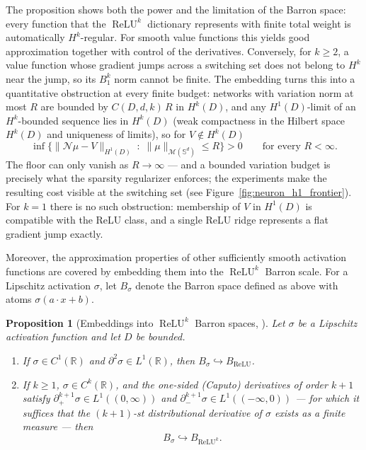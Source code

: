\documentclass[11pt]{amsart}
\newtheorem{proposition}[theorem]{Proposition}
\theoremstyle{definition}
\theoremstyle{remark}
\DeclareMathOperator{\relu}{ReLU}
\newcommand{\reluk}{\relu^{k}}
\begin{document}
The proposition shows both the power and the limitation of the Barron space: every function that the $\reluk$ dictionary represents with finite total weight is automatically $H^k$-regular.
For smooth value functions this yields good approximation together with control of the derivatives.
Conversely, for $k \ge 2$, a value function whose gradient jumps across a switching set does not belong to $H^k$ near the jump, so its $B_1^k$ norm cannot be finite. The embedding turns this into a quantitative obstruction at every finite budget: networks with variation norm at most $R$ are bounded by $C(D, d, k)\, R$ in $H^k(D)$, and any $H^1(D)$-limit of an $H^k$-bounded sequence lies in $H^k(D)$ (weak compactness in the Hilbert space $H^k(D)$ and uniqueness of limits), so for $V \notin H^k(D)$
\begin{equation*}
	\inf \big\{ \|\mathcal{N}\mu - V\|_{H^1(D)} \;:\; \|\mu\|_{\mathcal{M}(\mathbb{S}^d)} \le R \big\} > 0
	\qquad \text{for every } R < \infty.
\end{equation*}
The floor can only vanish as $R \to \infty$ --- and a bounded variation budget is precisely what the sparsity regularizer enforces; the experiments make the resulting cost visible at the switching set (see Figure~\ref{fig:neuron_h1_frontier}). For $k = 1$ there is no such obstruction: membership of $V$ in $H^1(D)$ is compatible with the ReLU class, and a single ReLU ridge represents a flat gradient jump exactly.

Moreover, the approximation properties of other sufficiently smooth activation functions are covered by embedding them into the $\reluk$ Barron scale. For a Lipschitz activation $\sigma$, let $B_\sigma$ denote the Barron space defined as above with atoms $\sigma(a \cdot x + b)$.

\begin{proposition}[Embeddings into $\reluk$ Barron spaces, {\cite[Theorem~1]{heeringa2024embeddings}}]
	Let $\sigma$ be a Lipschitz activation function and let $D$ be bounded.
	\begin{enumerate}
		\item If $\sigma \in C^1(\mathbb{R})$ and $\partial^2 \sigma \in L^1(\mathbb{R})$, then $B_\sigma \hookrightarrow B_{\relu}$.
		\item If $k \ge 1$, $\sigma \in C^{k}(\mathbb{R})$, and the one-sided (Caputo) derivatives of order $k+1$ satisfy $\partial_+^{k+1}\sigma \in L^1((0, \infty))$ and $\partial_-^{k+1}\sigma \in L^1((-\infty, 0))$ --- for which it suffices that the $(k+1)$-st distributional derivative of $\sigma$ exists as a finite measure --- then
		\begin{equation*}
			B_\sigma \hookrightarrow B_{\relu^{k}}.
		\end{equation*}
	\end{enumerate}
\end{proposition}
\end{document}
